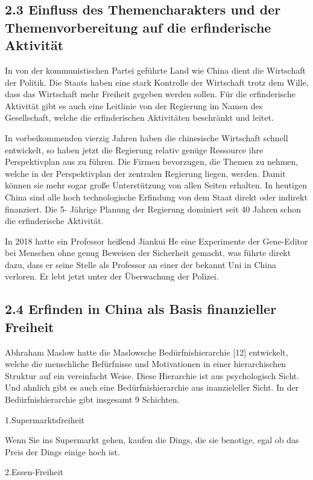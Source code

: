 \documentclass[11pt,a4paper]{article}
\begin{document}
\subsection{2.3 Einfluss des Themencharakters und der Themenvorbereitung auf
  die erfinderische Aktivität} 

In von der kommunistischen Partei geführte Land wie China dient die Wirtschaft
der Politik. Die Staats haben eine stark Kontrolle der Wirtschaft trotz dem
Wille, dass das Wirtschaft mehr Freiheit gegeben werden sollen. Für die
erfinderische Aktivität gibt es auch eine Leitlinie von der Regierung im Namen
des Gesellschaft, welche die erfinderischen Aktivitäten beschränkt und leitet.

In vorbeikommenden vierzig Jahren haben die chinesische Wirtschaft schnell
entwickelt, so haben jetzt die Regierung relativ genüge Ressource ihre
Perspektivplan aus zu führen. Die Firmen bevorzugen, die Themen zu nehmen,
welche in der Perspektivplan der zentralen Regierung liegen, werden. Damit
können sie mehr sogar große Unterstützung von allen Seiten erhalten. In
heutigen China sind alle hoch technologische Erfindung von dem Staat direkt
oder indirekt finanziert. Die 5- Jährige Planung der Regierung dominiert seit
40 Jahren schon die erfinderische Aktivität.

In 2018 hatte ein Professor heißend Jiankui He eine Experimente der
Gene-Editor bei Menschen ohne genug Beweisen der Sicherheit gemacht, was
führte direkt dazu, dass er seine Stelle als Professor an einer der bekannt
Uni in China verloren. Er lebt jetzt unter der Überwachung der Polizei.

\subsection{2.4 Erfinden in China als Basis finanzieller Freiheit}

Abhraham Maslow hatte die Maslowsche Bedürfnishierarchie [12] entwickelt,
welche die menschliche Befürfnisse und Motivationen  in einer hierarchischen
Struktur auf ein vereinfacht Weise. Diese Hierarchie ist aus psychologisch
Sicht. Und ahnlich gibt es auch eine Bedürfnishierarchie aus inanzieleller
Sicht. In der Bedürfnishierarchie gibt insgesamt 9 Schichten.

1.Supermarktsfreiheit

Wenn Sie ins Supermarkt gehen, kaufen die Dings, die sie benotige, egal ob das
Preis der Dings einige hoch ist.

2.Essen-Freiheit
\end{document}

